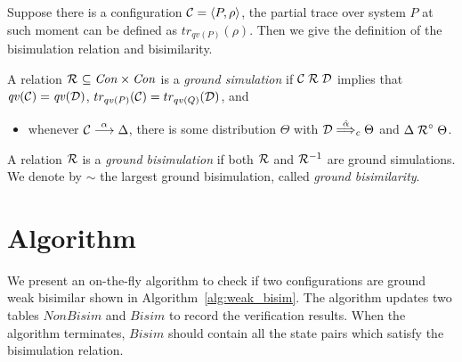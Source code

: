\documentclass[a4paper,runningheads]{llncs}
\newcommand{\lift}[1]{\mathrel{{#1}^\circ}}
\newcommand{\Con}{{\it Con}}
\newcommand{\qv}{{\it qv}}
\newcommand{\CC}{{\cal C}}
\newcommand{\CD}{{\cal D}}
\begin{document}
Suppose there is a configuration $\CC=\langle P,\rho\rangle$, the partial trace over system $P$ at such moment can be defined as $tr_{qv(P)}(\rho)$. Then we give the definition of the bisimulation relation and bisimilarity. 

\begin{definition}[\cite{DF12}]
	A relation $\aRel\ \subseteq \Con\times\Con$ is a \emph{ground simulation} if
	$\CC\aRel \CD$ implies that $\qv(\CC)=\qv(\CD)$, $tr_{qv(P)}(\CC)=tr_{qv(Q)}(\CD)$,
	and
	\begin{itemize}
		\item whenever $\CC\ar{\alpha} \Delta$, there is some distribution $\Theta$ with $\CD\dar{\hat{\alpha}}_{c}\Theta$ and $\Delta \lift{\aRel} \Theta$.
	\end{itemize}
	A relation $\mathrel{{\mathcal R }}$ is a \emph{ground bisimulation} if both $\mathrel{{\mathcal R }}$ and
	$\mathrel{{\mathcal R }}^{-1}$ are ground simulations. %
	We denote by $\sim$ the largest ground bisimulation, called \emph{ground bisimilarity}.
\end{definition}

\section{Algorithm}
\label{sec:algorithm}
We present an on-the-fly algorithm to check if two configurations are ground weak bisimilar shown in Algorithm~\ref{alg:weak_bisim}. The algorithm updates two tables $NonBisim$ and $Bisim$ to record the verification results. When the algorithm terminates, $Bisim$ should contain all the state pairs which satisfy the bisimulation relation.
\end{document}
